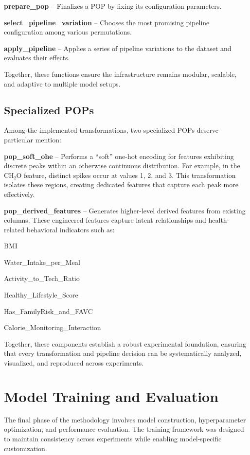 \textbf{prepare\_pop} – Finalizes a POP by fixing its configuration parameters.

\textbf{select\_pipeline\_variation} – Chooses the most promising pipeline configuration among various permutations.

\textbf{apply\_pipeline} – Applies a series of pipeline variations to the dataset and evaluates their effects.

Together, these functions ensure the infrastructure remains modular, scalable, and adaptive to multiple model setups.

\subsection{Specialized POPs}\label{subsec:specialized-pops}
Among the implemented transformations, two specialized POPs deserve particular mention:

\textbf{pop\_soft\_ohe} – Performs a “soft” one-hot encoding for features exhibiting discrete peaks within an otherwise continuous distribution.
For example, in the CH₂O feature, distinct spikes occur at values 1, 2, and 3.
This transformation isolates these regions, creating dedicated features that capture each peak more effectively.

\textbf{pop\_derived\_features} – Generates higher-level derived features from existing columns.
These engineered features capture latent relationships and health-related behavioral indicators such as:

BMI

Water\_Intake\_per\_Meal

Activity\_to\_Tech\_Ratio

Healthy\_Lifestyle\_Score

Has\_FamilyRisk\_and\_FAVC

Calorie\_Monitoring\_Interaction

Together, these components establish a robust experimental foundation, ensuring that every transformation and pipeline decision can be systematically analyzed, visualized, and reproduced across experiments.


\section{Model Training and Evaluation}\label{sec:model-training-and-evaluation}
The final phase of the methodology involves model construction, hyperparameter optimization, and performance evaluation.
The training framework was designed to maintain consistency across experiments while enabling model-specific customization.

